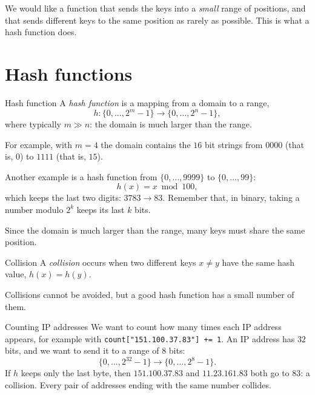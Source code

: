 \documentclass[a4paper,12pt,oneside]{report}
\begin{document}
We would like a function that sends the keys into a \emph{small}
range of positions, and that sends different keys to the same
position as rarely as possible. This is what a hash function does.

\section{Hash functions}

\begin{frameddefn}{Hash function}\label{def:hash-function}
A \emph{hash function} is a mapping from a domain to a range,
\[
  h:\{0,\ldots,2^m-1\}\to\{0,\ldots,2^n-1\},
\]
where typically $m\gg n$: the domain is much larger than the range.
\end{frameddefn}

For example, with $m=4$ the domain contains the $16$ bit strings
from $0000$ (that is, $0$) to $1111$ (that is, $15$).

\begin{center}
\end{center}

Another example is a hash function from $\{0,\ldots,9999\}$ to
$\{0,\ldots,99\}$:
\[
  h(x)=x \bmod 100,
\]
which keeps the last two digits: $3783\to83$. Remember that, in
binary, taking a
number modulo $2^k$ keeps its last $k$ bits.

Since the domain is much larger than the range, many keys must
share the same position.

\begin{frameddefn}{Collision}\label{def:collision}
A \emph{collision} occurs when two different keys $x\neq y$ have
the same hash value, $h(x)=h(y)$.
\end{frameddefn}

Collisions cannot be avoided, but a good hash function has a small
number of them.

\begin{framedexample}{Counting IP addresses}
We want to count how many times each IP address appears, for
example with \verb|count["151.100.37.83"] += 1|. An IP address has
$32$ bits, and we want to send it to a range of $8$ bits:
\[
  \{0,\ldots,2^{32}-1\}\to\{0,\ldots,2^{8}-1\}.
\]
If $h$ keeps only the last byte, then $151.100.37.83$ and
$11.23.161.83$ both go to $83$: a collision. Every pair of
addresses ending with the same number collides.
\end{framedexample}
\end{document}

